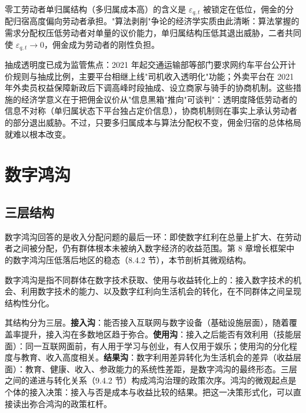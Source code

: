 零工劳动者单归属结构（多归属成本高）的含义是 $\varepsilon_{q,t}$ 被锁定在低位，佣金的分配归宿高度偏向劳动者承担。"算法剥削"争论的经济学实质由此清晰：算法掌握的需求分配权压低劳动者对单量的议价能力，单归属结构压低其退出威胁，二者共同使 $\varepsilon_{q,t} \to 0$，佣金成为劳动者的刚性负担。

抽成透明度已成为监管焦点：2021 年起交通运输部等部门要求网约车平台公开计价规则与抽成比例，主要平台相继上线"司机收入透明化"功能；外卖平台在 2021 年外卖员权益保障新政后下调高峰时段抽成、设立商家与骑手的协商机制。这些措施的经济学意义在于把佣金议价从"信息黑箱"推向"可谈判"：透明度降低劳动者的信息不对称（单归属状态下平台独占定价信息），协商机制则在事实上承认劳动者的部分退出威胁。不过，只要多归属成本与算法分配权不变，佣金归宿的总体格局就难以根本改变。

\section{数字鸿沟}

\subsection{三层结构}

数字鸿沟回答的是收入分配问题的最后一环：即使数字红利在总量上扩大、在劳动者之间被分配，仍有群体根本未被纳入数字经济的收益范围。第 8 章增长框架中的数字鸿沟压低落后地区的稳态（8.4.2 节），本节剖析其微观结构。

\begin{definition}[数字鸿沟]
数字鸿沟是指不同群体在数字技术获取、使用与收益转化上的：接入数字技术的机会、利用数字技术的能力、以及数字红利向生活机会的转化，在不同群体之间呈现结构性分化。
\end{definition}

其结构分为三层。\textbf{接入沟}：能否接入互联网与数字设备（基础设施层面），随着覆盖率提升，接入沟在多数地区趋于弥合。\textbf{使用沟}：接入之后能否有效利用（技能层面）：同一互联网面前，有人用于学习与创业，有人仅用于娱乐；使用沟的分化程度与教育、收入高度相关。\textbf{结果沟}：数字利用差异转化为生活机会的差异（收益层面）：教育、健康、收入、参政能力的系统性差距，是数字鸿沟的最终形态。三层之间的递进与转化关系（9.4.2 节）构成鸿沟治理的政策次序。鸿沟的微观起点是个体的接入决策：接入与否是成本与收益比较的结果。把这一决策形式化，可以直接读出弥合鸿沟的政策杠杆。

